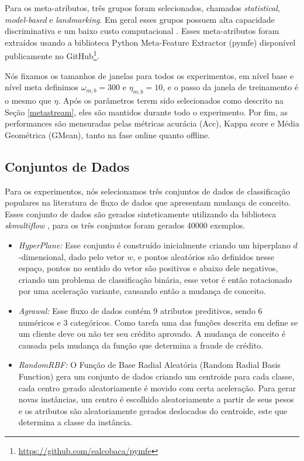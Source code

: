 \documentclass[conference,compsoc]{IEEEtran}
\begin{document}
Para os meta-atributos, três grupos foram selecionados, chamados \textit{statistical}, \textit{model-based} e \textit{landmarking}. Em geral esses grupos possuem alta capacidade discriminativa e um baixo custo computacional \cite{rivolli2018towards}. Esses meta-atributos foram extraídos usando a biblioteca Python Meta-Feature Extractor (pymfe) \cite{pymfe2020}  disponível publicamente no GitHub\footnote{\url{https://github.com/ealcobaca/pymfe}}.

Nós fixamos os tamanhos de janelas para todos os experimentos, em nível base e nível meta definimos $\omega_{m;b} = 300$ e $\eta_{m;b} = 10$, e o passo da janela de treinamento é o mesmo que $\eta$. Após os parâmetros terem sido selecionados como descrito na Seção \ref{metastream}, eles são mantidos durante todo o experimento. Por fim, as performances são mensuradas pelas métricas acurácia (Acc), Kappa score e Média Geométrica (GMean), tanto na fase online quanto offline.

\subsection{Conjuntos de Dados}
\label{datasets}

Para os experimentos, nós selecionamos três conjuntos de dados de classificação populares na literatura de fluxo de dados que apresentam mudança de conceito. Esses conjunto de dados são gerados sinteticamente utilizando da biblioteca \textit{skmultiflow} \cite{skmultiflow}, para os três conjuntos foram gerados 40000 exemplos.

\begin{itemize}
\item{\textit{HyperPlane:}} Esse conjunto é construído inicialmente criando um hiperplano $d$-dimensional, dado pelo vetor $w$, e pontos aleatórios são definidos nesse espaço, pontos no sentido do vetor são positivos e abaixo dele negativos, criando um problema de classificação binária, esse vetor é então rotacionado por uma aceleração variante, causando então a mudança de conceito.

\item{\textit{Agrawal:}} Esse fluxo de dados contém 9 atributos preditivos, sendo 6 numéricos e 3 categóricos. Como tarefa uma das funções descrita em \cite{agrawal1993database} define se um cliente deve ou não ter seu crédito aprovado. A mudança de conceito é causada pela mudança da função que determina a fraude de crédito.

\item{\textit{RandomRBF:}} O Função de Base Radial Aleatória (Random Radial Basis Function) gera um conjunto de dados criando um centroide para cada classe, cada centro gerado aleatoriamente é movido com certa aceleração. Para gerar novas instâncias, um centro é escolhido aleatoriamente a partir de seus pesos e os atributos são aleatoriamente gerados deslocados do centroide, este que determina a classe da instância.
\end{itemize}
\end{document}
